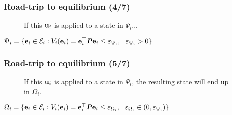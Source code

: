 \begin{frame} %
  \frametitle{Road-trip to equilibrium (4/7)}

\begin{figure}
  \scalebox{0.55}{}
  \caption{If this $\bm{\mathbf{u}}_i$ is applied to a state in $\Psi_i$...}
\end{figure}

$\Psi_i = \{\bm{\mathbf{e}}_i \in \mathcal{E}_i : V_i(\bm{\mathbf{e}}_i) = \bm{\mathbf{e}}_i^{\top} \bm{\mathit{P}} \bm{\mathbf{e}}_i \leq \varepsilon_{\Psi_i},\ \ \varepsilon_{\Psi_i} > 0 \}$
\end{frame} %
\begin{frame} %
  \frametitle{Road-trip to equilibrium (5/7)}

\begin{figure}
  \scalebox{0.55}{}
  \caption{If this $\bm{\mathbf{u}}_i$ is applied to a state in $\Psi_i$, the
    resulting state will end up in $\Omega_i$.}
\end{figure}

$\Omega_i = \{\bm{\mathbf{e}}_i \in \mathcal{E}_i : V_i(\bm{\mathbf{e}}_i) = \bm{\mathbf{e}}_i^{\top} \bm{\mathit{P}} \bm{\mathbf{e}}_i \leq \varepsilon_{\Omega_i},\ \ \varepsilon_{\Omega_i} \in (0, \varepsilon_{\Psi_i})  \}$
\end{frame} %

